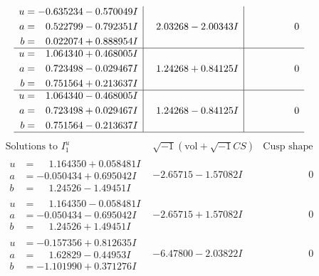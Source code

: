 \documentclass[1p]{elsarticle_modified}
\theoremstyle{definition}
\newcommand{\I}{\sqrt{-1}}
\begin{document}
$$\begin{array}{c|c|c}
\begin{aligned}
u &= -0.635234 - 0.570049 I \\
a &= \phantom{-}0.522799 - 0.792351 I \\
b &= \phantom{-}0.022074 + 0.888954 I\end{aligned}
 & \phantom{-}2.03268 - 2.00343 I & \phantom{-0.000000 } 0 \\ \hline\begin{aligned}
u &= \phantom{-}1.064340 + 0.468005 I \\
a &= \phantom{-}0.723498 - 0.029467 I \\
b &= \phantom{-}0.751564 + 0.213637 I\end{aligned}
 & \phantom{-}1.24268 + 0.84125 I & \phantom{-0.000000 } 0 \\ \hline\begin{aligned}
u &= \phantom{-}1.064340 - 0.468005 I \\
a &= \phantom{-}0.723498 + 0.029467 I \\
b &= \phantom{-}0.751564 - 0.213637 I\end{aligned}
 & \phantom{-}1.24268 - 0.84125 I & \phantom{-0.000000 } 0\\
 \hline 
 \end{array}$$\newpage$$\begin{array}{c|c|c}  
\text{Solutions to }I^u_{1}& \I (\text{vol} + \sqrt{-1}CS) & \text{Cusp shape}\\
 \hline 
\begin{aligned}
u &= \phantom{-}1.164350 + 0.058481 I \\
a &= -0.050434 + 0.695042 I \\
b &= \phantom{-}1.24526 - 1.49451 I\end{aligned}
 & -2.65715 - 1.57082 I & \phantom{-0.000000 } 0 \\ \hline\begin{aligned}
u &= \phantom{-}1.164350 - 0.058481 I \\
a &= -0.050434 - 0.695042 I \\
b &= \phantom{-}1.24526 + 1.49451 I\end{aligned}
 & -2.65715 + 1.57082 I & \phantom{-0.000000 } 0 \\ \hline\begin{aligned}
u &= -0.157356 + 0.812635 I \\
a &= \phantom{-}1.62829 - 0.44953 I \\
b &= -1.101990 + 0.371276 I\end{aligned}
 & -6.47800 - 2.03822 I & \phantom{-0.000000 } 0 \\ \hline\begin{aligned}

\end{aligned}
\end{array}$$
\end{document}
